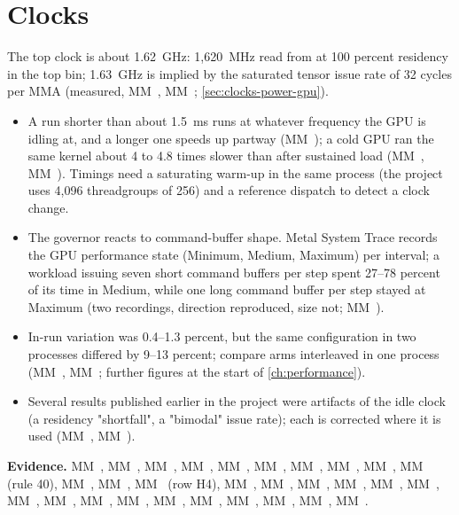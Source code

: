 \section{Clocks}\label{sec:clocks-performance-states}

The top clock is about 1.62~GHz: 1,620~MHz read from  at 100 percent residency in the top bin;
1.63~GHz is implied by the saturated tensor issue rate of 32 cycles per MMA (measured, MM~, MM~;
\cref{sec:clocks-power-gpu}).

\begin{itemize}
\item A run shorter than about 1.5~ms runs at whatever frequency the GPU is
  idling at, and a longer one speeds up partway (MM~); a cold GPU ran the same kernel about 4 to 4.8 times slower
  than after sustained load (MM~, MM~). Timings need a saturating warm-up in the same process (the project uses
  4,096 threadgroups of 256) and a reference dispatch to detect a clock change.
\item The governor reacts to command-buffer shape. Metal System Trace records the GPU performance state (Minimum,
  Medium, Maximum) per interval; a workload issuing seven short command buffers per step spent 27–78 percent of its time
  in Medium, while one long command buffer per step stayed at Maximum (two recordings, direction reproduced, size not;
  MM~).
\item In-run variation was 0.4–1.3 percent, but the same configuration in two
  processes differed by 9–13 percent; compare arms interleaved in one process (MM~, MM~; further figures at the start of \cref{ch:performance}).
\item Several results published earlier in the project were artifacts of the idle clock (a
  residency "shortfall", a "bimodal" issue rate); each is corrected where it is used (MM~, MM~).
\end{itemize}

\textbf{Evidence.} MM~, MM~, MM~, MM~, MM~, MM~, MM~, MM~, MM~,
MM~ (rule 40), MM~, MM~, MM~ (row H4), MM~, MM~, MM~,
MM~, MM~, MM~, MM~, MM~, MM~, MM~,
MM~, MM~, MM~, MM~, MM~, MM~.
